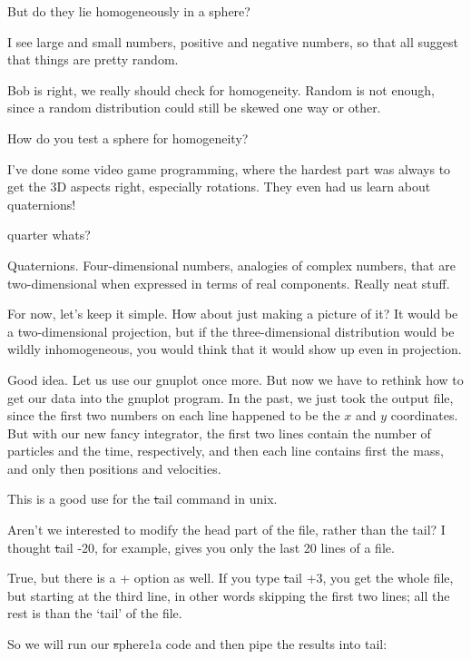 \bob
But do they lie homogeneously in a sphere?

\carol
I see large and small numbers, positive and negative numbers, so that
all suggest that things are pretty random.

\alice
Bob is right, we really should check for homogeneity.  Random is not
enough, since a random distribution could still be skewed one way or
other.

\bob
How do you test a sphere for homogeneity?

\carol
I've done some video game programming, where the hardest part was
always to get the 3D aspects right, especially rotations.  They even
had us learn about quaternions!

\bob
quarter whats?

\carol
Quaternions.  Four-dimensional numbers, analogies of complex numbers,
that are two-dimensional when expressed in terms of real components.
Really neat stuff.  

\bob
For now, let's keep it simple.  How about just making a picture of it?
It would be a two-dimensional projection, but if the three-dimensional
distribution would be wildly inhomogeneous, you would think that it
would show up even in projection.

\alice
Good idea.  Let us use our gnuplot once more.  But now we have to
rethink how to get our data into the gnuplot program.  In the past, we
just took the output file, since the first two numbers on each line
happened to be the $x$ and $y$ coordinates.  But with our new fancy
integrator, the first two lines contain the number of particles and
the time, respectively, and then each line contains first the mass,
and only then positions and velocities.

\carol
This is a good use for the {\st tail} command in unix.

\bob
Aren't we interested to modify the head part of the file, rather than
the tail?  I thought {\st tail -20}, for example, gives you only the
last 20 lines of a file.

\carol
True, but there is a {+} option as well.  If you type {\st tail +3},
you get the whole file, but starting at the third line, in other words
skipping the first two lines; all the rest is than the `tail' of the
file.

\alice
So we will run our {\st sphere1a} code and then pipe the results into
tail:

\cba

